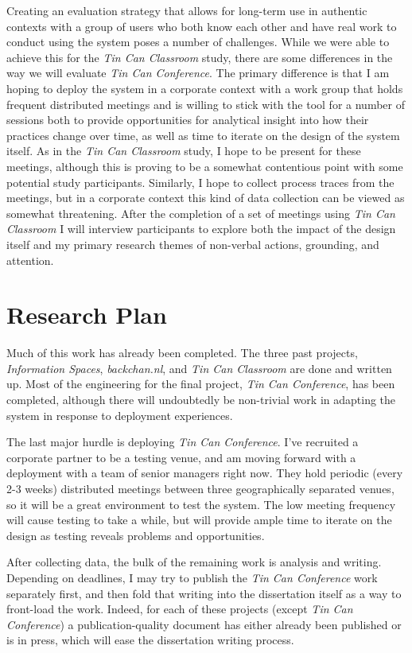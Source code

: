 \documentclass{tufte-handout}
\begin{document}
Creating an evaluation strategy that allows for long-term use in authentic contexts with a group of users who both know each other and have real work to conduct using the system poses a number of challenges. While we were able to achieve this for the \emph{Tin Can Classroom} study, there are some differences in the way we will evaluate \emph{Tin Can Conference}. The primary difference is that I am hoping to deploy the system in a corporate context with a work group that holds frequent distributed meetings and is willing to stick with the tool for a number of sessions both to provide opportunities for analytical insight into how their practices change over time, as well as time to iterate on the design of the system itself. As in the \emph{Tin Can Classroom} study, I hope to be present for these meetings, although this is proving to be a somewhat contentious point with some potential study participants. Similarly, I hope to collect process traces from the meetings, but in a corporate context this kind of data collection can be viewed as somewhat threatening. After the completion of a set of meetings using \emph{Tin Can Classroom} I will interview participants to explore both the impact of the design itself and my primary research themes of non-verbal actions, grounding, and attention.



\section{Research Plan}

Much of this work has already been completed. The three past projects, \emph{Information Spaces}, \emph{backchan.nl}, and \emph{Tin Can Classroom} are done and written up. Most of the engineering for the final project, \emph{Tin Can Conference}, has been completed, although there will undoubtedly be non-trivial work in adapting the system in response to deployment experiences.

The last major hurdle is deploying \emph{Tin Can Conference}. I've recruited a corporate partner to be a testing venue, and am moving forward with a deployment with a team of senior managers right now. They hold periodic (every 2-3 weeks) distributed meetings between three geographically separated venues, so it will be a great environment to test the system. The low meeting frequency will cause testing to take a while, but will provide ample time to iterate on the design as testing reveals problems and opportunities. 

After collecting data, the bulk of the remaining work is analysis and writing. Depending on deadlines, I may try to publish the \emph{Tin Can Conference} work separately first, and then fold that writing into the dissertation itself as a way to front-load the work. Indeed, for each of these projects (except \emph{Tin Can Conference}) a publication-quality document has either already been published or is in press, which will ease the dissertation writing process.
\end{document}
